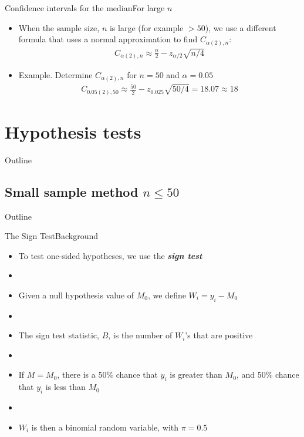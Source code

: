 \documentclass[xcolor=dvipsnames]{beamer}
\begin{document}
\begin{frame}{Confidence intervals for the median}{For large $n$}
	\begin{itemize}
		\item When the sample size, $n$ is large (for example $>50$), we use a different formula that uses a normal approximation to find $C_{\alpha(2),n}$:
		\begin{gather*}
		C_{\alpha(2),n} \approx \frac{n}{2} - z_{\alpha / 2} \sqrt{n/4}
		\end{gather*} \pause
		\item Example. Determine $C_{\alpha(2),n}$ for $n = 50$ and $\alpha = 0.05$
		\begin{gather*}
		C_{0.05(2),50} \approx \frac{50}{2} - z_{0.025} \sqrt{50/4} = 18.07 \approx 18
		\end{gather*}
	\end{itemize}
\end{frame}

\section{Hypothesis tests}
\begin{frame}{Outline}
\tableofcontents[currentsection,subsectionstyle=show/shaded/hide]
\end{frame}

\subsection{Small sample method $n \leq 50$}
\begin{frame}{Outline}
\tableofcontents[currentsection,subsectionstyle=show/shaded/hide]
\end{frame}

\begin{frame}{The Sign Test}{Background}
	\begin{itemize}
		\item To test one-sided hypotheses, we use the \textbf{\emph{sign test}} \pause
		\item[]
		\item Given a null hypothesis value of $M_0$, we define $W_i = y_i - M_0$ \pause
		\item[]
		\item The sign test statistic, $B$, is the number of $W_i$'s that are positive \pause
		\item[]
		\item If $M = M_0$, there is a 50\% chance that $y_i$ is greater than $M_0$, and 50\% chance that $y_i$ is less than $M_0$ \pause
		\item[]
		\item $W_i$ is then a binomial random variable, with $\pi = 0.5$
	\end{itemize}
\end{frame}
\end{document}
